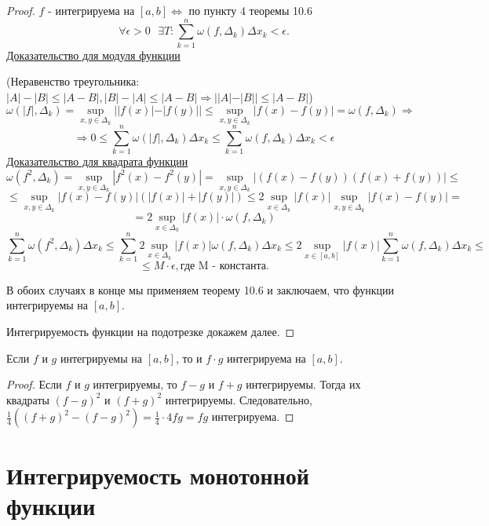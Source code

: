     \begin{proof}
    	$f$ - интегрируема на $[a, b] \Leftrightarrow$ по пункту 4 теоремы 10.6 
    	\[ \forall \epsilon > 0 \text{ } \exists T: \sum_{k = 1}^n \omega(f, \Delta_k) \Delta x_k < \epsilon. \]
    	\underline{Доказательство для модуля функции}
    	
    	(Неравенство треугольника: $|A| - |B| \leqslant |A - B|, |B| - |A| \leqslant |A - B| \Rightarrow ||A| - |B|| \leqslant |A - B|$)
    	\[ \omega(|f|, \Delta_k) = \sup_{x, y \in \Delta_k} {||f(x)| - |f(y)||} \leqslant \sup_{x, y \in \Delta_k} {|f(x) - f(y)|} = \omega(f, \Delta_k) \Rightarrow \]
    	\[ \Rightarrow 0 \leqslant \sum_{k = 1}^n {\omega(|f|, \Delta_k)} \Delta x_k \leqslant \sum_{k = 1}^n \omega(f, \Delta_k) \Delta x_k < \epsilon \]
    	\underline{Доказательство для квадрата функции}
    	\[ \omega(f^2, \Delta_k) = \sup_{x, y \in \Delta_k} {|f^2(x) - f^2(y)|} = \sup_{x, y \in \Delta_k} {|(f(x) - f(y))(f(x) + f(y))|} \leqslant \]
    	\[ \leqslant \sup_{x, y \in \Delta_k} {|f(x) - f(y)|(|f(x)| + |f(y)|)} \leqslant 2\sup_{x \in \Delta_k} {|f(x)|} \sup_{x, y \in \Delta_k} {|f(x) - f(y)|} = \]
    	\[ = 2\sup_{x \in \Delta_k} {|f(x)|} \cdot \omega(f, \Delta_k) \]
    	\[ \sum_{k = 1}^n \omega(f^2, \Delta_k) \Delta x_k \leqslant \sum_{k = 1}^n 2\sup_{x \in \Delta_k} {|f(x)| \omega(f, \Delta_k) \Delta x_k} \leqslant 2\sup_{x \in [a, b]} |f(x)| \sum_{k = 1}^n \omega(f, \Delta_k) \Delta x_k \leqslant \]
    	\[ \leqslant M \cdot \epsilon, \text{где M - константа}. \]
    	
    	В обоих случаях в конце мы применяем теорему 10.6 и заключаем, что функции интегрируемы на $[a, b]$.
    	
    	Интегрируемость функции на подотрезке докажем далее.
    \end{proof}
    
    \begin{corollary}
    	Если $f$ и $g$ интегрируемы на $[a, b]$, то и $f \cdot g$ интегрируема на $[a, b]$.
    \end{corollary}
    
    \begin{proof}
    	Если $f$ и $g$ интегрируемы, то $f - g$ и $f + g$ интегрируемы. Тогда их квадраты $(f - g)^2$ и $(f + g)^2$ интегрируемы. Следовательно, $\frac{1}{4}((f + g)^2 - (f - g)^2) = \frac{1}{4} \cdot 4fg = fg$ интегрируема.
    \end{proof}
    
    \section{Интегрируемость монотонной функции}
    
